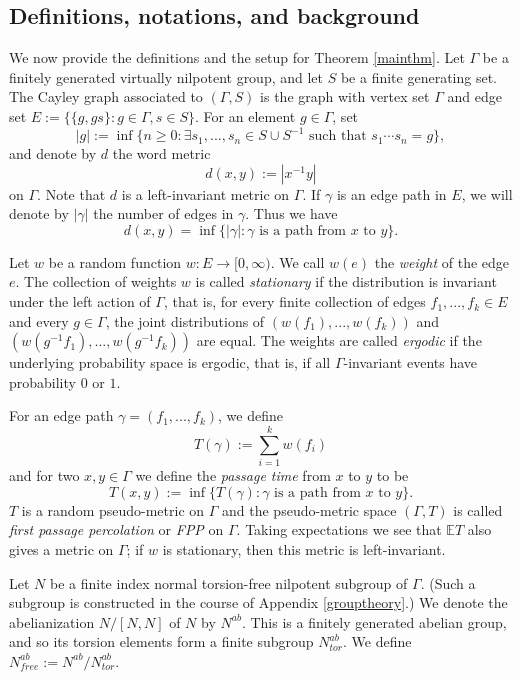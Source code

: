 \documentclass[12pt,reqno]{article}
\numberwithin{equation}{section}
\newcommand{\E}{\mathbb{E}}
\begin{document}
 

 
 
\subsection{Definitions, notations, and background} \label{defnsandbackground}
We now provide the definitions and the setup for Theorem \ref{mainthm}. 
Let $\Gamma$ be a finitely generated virtually nilpotent group, 
and let $S$ be a finite generating set. 
 The Cayley graph associated to $(\Gamma,S)$
 is the graph with vertex set $\Gamma$ and edge set $E:=\{ \{g,gs\} : g \in \Gamma, s \in S \}$. 
 For an element $g \in \Gamma$, set 
 \[ |g| := \inf \{ n \ge 0 : \exists s_1,...,s_n \in S \cup S^{-1} \mbox{ such that } s_1 \cdots s_n = g\}, \]
 and denote by $d$ the word metric
 \[ d(x,y) := |x^{-1} y| \]
 on $\Gamma$. Note that $d$ is a left-invariant metric on $\Gamma$.
 If $\gamma$ is an edge path in $E$, we will denote by $|\gamma|$ the number of edges in $\gamma$.
 Thus we have
 \[ d(x,y) = \inf \{ |\gamma| : \gamma \mbox{ is a path from } x \mbox{ to } y \}. \]
  
 Let $w$ be a random function $w:E \to [0,\infty)$. We call $w(e)$ the \emph{weight} of the edge $e$. 
 The collection of weights $w$ is called \emph{stationary} if the distribution is invariant under the left action of $\Gamma$, that is,
 for every finite collection of edges $f_1,...,f_k \in E$ and every $g \in \Gamma$, the joint distributions of $(w(f_1),...,w(f_k))$
 and $(w(g^{-1} f_1),..., w(g^{-1} f_k))$ are equal. The weights are called \emph{ergodic} if the underlying probability space
 is ergodic, that is, if all $\Gamma$-invariant events have probability $0$ or $1$.
 
 For an edge path $\gamma=(f_1,...,f_k)$,
 we define 
 \[ T(\gamma) := \sum_{i=1}^k w(f_i) \]
 and for two $x,y \in \Gamma$ we define the \emph{passage time} from $x$ to $y$ to be
 \[ T(x,y) := \inf \{ T(\gamma) : \gamma \mbox{ is a path from } x \mbox{ to } y \}. \]
 $T$ is a random pseudo-metric on $\Gamma$ and the pseudo-metric space $(\Gamma, T)$ is called  \emph{first passage percolation} or \emph{FPP} on $\Gamma$. Taking expectations
 we see that $\E T$ also gives a metric on $\Gamma$; if $w$ is stationary, then this metric is left-invariant.

Let $N$ be a finite index normal torsion-free nilpotent subgroup of $\Gamma$. (Such a subgroup is constructed in the course
of Appendix \ref{grouptheory}.) We denote the abelianization $N/[N,N]$ of $N$ by $N^{ab}$. This is a finitely generated abelian group, and so its torsion elements
form a finite subgroup $N^{ab}_{tor}$. We define $N^{ab}_{free} := N^{ab}/N^{ab}_{tor}$.
\end{document}
